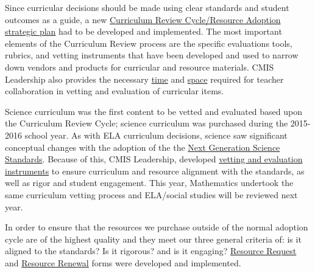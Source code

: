 \documentclass{report}
\begin{document}
\begin{findings}
\href{https://docs.google.com/a/cmis.ac.th/document/d/1hh1nLUlJgg1hd7s6aG3u3We0L6o7Wg_ECdjc2f6DcT8/edit?usp=sharing}{}

Since curricular decisions should be made using clear standards and student outcomes as a guide, a new \href{https://docs.google.com/presentation/d/15ZhVBwOO3psFCM44ybsXFUNqrhpHmVHdekAzIXjRJ5U/edit?usp=sharing}{Curriculum Review Cycle/Resource Adoption strategic plan} had to be developed and implemented. The most important elements of the Curriculum Review process are the specific evaluations tools, rubrics, and vetting instruments that have been developed and used to narrow down vendors and products for curricular and resource materials. CMIS Leadership also provides the necessary \href{https://drive.google.com/file/d/0B4n_WCeTYd4_U2J0YnRWYVp4bk0/view?usp=sharing}{time} and \href{https://drive.google.com/file/d/0B4n_WCeTYd4_NjBfVm92blF6T00/view?usp=sharing}{space} required for teacher collaboration in vetting and evaluation of curricular items. 

Science curriculum was the first content to be vetted and evaluated based upon the Curriculum Review Cycle; science curriculum was purchased during the 2015-2016 school year. As with ELA curriculum decisions, science saw significant conceptual changes with the adoption of the the \href{https://drive.google.com/a/cmis.ac.th/file/d/0B71_pYxcTLo-eUtQZE9DLTFvYUE/view?usp=sharing}{Next Generation Science Standards}. Because of this, CMIS Leadership, developed \href{https://docs.google.com/a/cmis.ac.th/document/d/1u0crwv2uVJdfamGYP9NYsUvub7bkPO64dIu0uAAkSIo/edit?usp=sharing}{vetting and evaluation instruments} to ensure curriculum and resource alignment with the standards, as well as rigor and student engagement. This year, Mathematics undertook the same curriculum vetting process and ELA/social studies will be reviewed next year. 

In order to ensure that the resources we purchase outside of the normal adoption cycle are of the highest quality and they meet our three general criteria of: is it aligned to the standards? Is it rigorous? and is it engaging? \href{https://goo.gl/forms/715q4GLbzFj9JRPZ2}{Resource Request} and \href{https://goo.gl/forms/N2Oow0UnpUr7bOzw1}{Resource Renewal} forms were developed and implemented. 



\end{findings}
\end{document}
